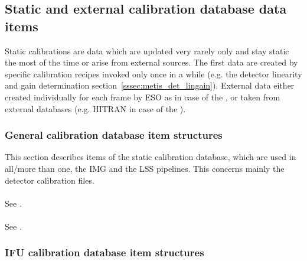 
\subsection{Static and external calibration database data items}\label{ssec:caldb_items_structures}
Static calibrations are data which are updated very rarely only and stay static the most of the time or arise from external sources. The first data are created by specific calibration recipes invoked only once in a while (e.g. the detector linearity and gain determination section~\ref{sssec:metis_det_lingain}). External data either created individually for each frame by \ac{ESO} as in case of the \hyperref[dataitem:persistence_map]{}, or taken from external databases (e.g. \ac{HITRAN} in case of the \hyperref[dataitem:atm_line_cat]{}).

\subsubsection{General calibration database item structures}\label{sssec:generalcaldbdatastructs}
This section describes items of the static calibration database, which are used in all/more than one, the \ac{IMG} and the \ac{LSS} pipelines. This concerns mainly the detector calibration files.

\paragraph{\hyperref[dataitem:gain_map_det]{}}\label{dataitem:gain_map_det}\label{dataitem:gainmap}

\paragraph{\hyperref[dataitem:gain_map_lm]{}}\label{dataitem:gain_map_lm}
See \hyperref[dataitem:gain_map_det]{}.

\paragraph{\hyperref[dataitem:gain_map_n]{}}\label{dataitem:gain_map_n}
See \hyperref[dataitem:gain_map_det]{}.

\subsubsection{IFU calibration database item structures}\label{sssec:lmscaldbdatastructs}


